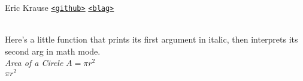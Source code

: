 \documentclass{article}
\newcommand{\sauerheader}[0] %
{
	\begin{center}
	Eric Krause \hfill 
	\texttt{\href{https://github.com/ekrause}{<github>}} \hfill 
	\texttt{\href{http://www.sauerkrause.org}{<blag>}}
	\vspace*{-8pt}\\ 
	\hspace*{-18pt} 
	\hrulefill\\
	\end{center}
}
\newcommand{\quickequation}[2] %
{
	\textit{#1} $#2$ %
}
\begin{document}
\sauerheader %

Here's a little function that prints its first argument in italic, then interprets its second arg in math mode.\\ 

\quickequation{Area of a Circle}{A = \pi r ^2}\\
  

\quickequation{}{\pi r ^2}
\end{document}
